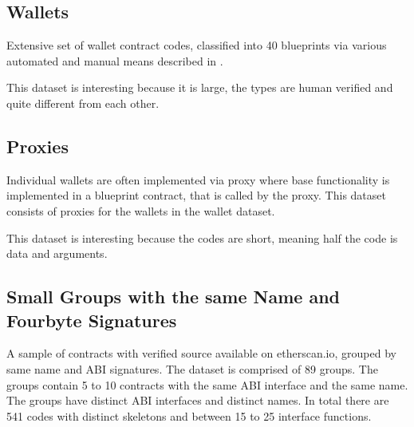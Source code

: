 \documentclass[../main.tex]{subfiles}
\begin{document}
\subsection{Wallets \label{sec:wallets}}
Extensive set of wallet contract codes, classified into 40 blueprints via various automated and manual means described in .

This dataset is interesting because it is large, the types are human verified and quite different from each other.

\subsection{Proxies \label{sec:proxies}}
Individual wallets are often implemented via proxy where base functionality is implemented in a blueprint contract, that is called by the proxy. This dataset consists of proxies for the wallets in the wallet dataset.

This dataset is interesting because the codes are short, meaning half the code is data and arguments.

\subsection{Small Groups with the same Name and Fourbyte Signatures \label{sec:abiGroups}}
A sample of contracts with verified source available on etherscan.io, grouped by same name and ABI signatures. The dataset is comprised of 89 groups. The groups contain 5 to 10 contracts with the same ABI interface and the same name. The groups have distinct ABI interfaces and distinct names.
In total there are 541 codes with distinct skeletons and between 15 to 25 interface functions.
\end{document}
